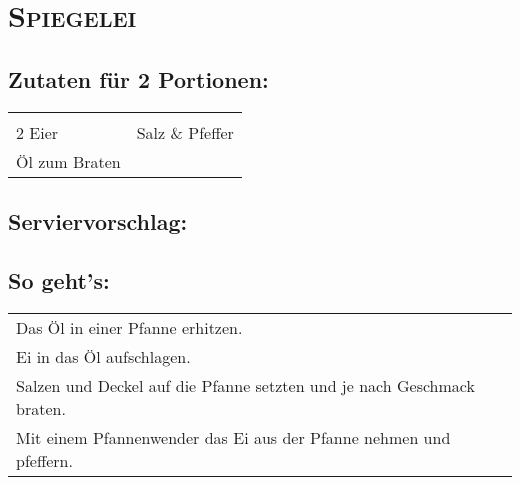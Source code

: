 \section{\textsc{Spiegelei}}

\subsection*{Zutaten für 2 Portionen:}

\begin{tabular}{p{7.5cm} p{7.5cm}}
	& \\
	2 Eier & Salz \& Pfeffer \\
	Öl zum Braten & 
\end{tabular}

\subsection*{Serviervorschlag:}


\subsection*{So geht's:}

\begin{tabular}{p{15cm}}
	\\
	Das Öl in einer Pfanne erhitzen.\\
	Ei in das Öl aufschlagen. \\
	Salzen und Deckel auf die Pfanne setzten und je nach Geschmack braten.\\
	Mit einem Pfannenwender das Ei aus der Pfanne nehmen und pfeffern.
\end{tabular}